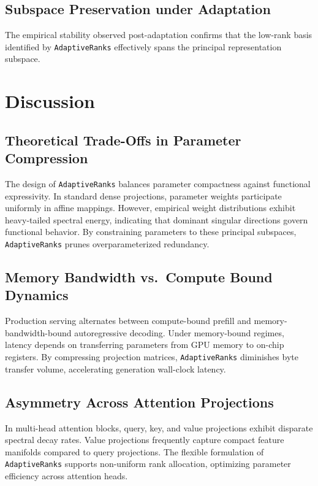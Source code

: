 \subsection{Subspace Preservation under Adaptation}
The empirical stability observed post-adaptation confirms that the low-rank basis identified by \texttt{AdaptiveRanks} effectively spans the principal representation subspace.


\section{Discussion}

\subsection{Theoretical Trade-Offs in Parameter Compression}
The design of \texttt{AdaptiveRanks} balances parameter compactness against functional expressivity. In standard dense projections, parameter weights participate uniformly in affine mappings. However, empirical weight distributions exhibit heavy-tailed spectral energy, indicating that dominant singular directions govern functional behavior. By constraining parameters to these principal subspaces, \texttt{AdaptiveRanks} prunes overparameterized redundancy.

\subsection{Memory Bandwidth vs.\ Compute Bound Dynamics}
Production serving alternates between compute-bound prefill and memory-bandwidth-bound autoregressive decoding. Under memory-bound regimes, latency depends on transferring parameters from GPU memory to on-chip registers. By compressing projection matrices, \texttt{AdaptiveRanks} diminishes byte transfer volume, accelerating generation wall-clock latency.

\subsection{Asymmetry Across Attention Projections}
In multi-head attention blocks, query, key, and value projections exhibit disparate spectral decay rates. Value projections frequently capture compact feature manifolds compared to query projections. The flexible formulation of \texttt{AdaptiveRanks} supports non-uniform rank allocation, optimizing parameter efficiency across attention heads.

